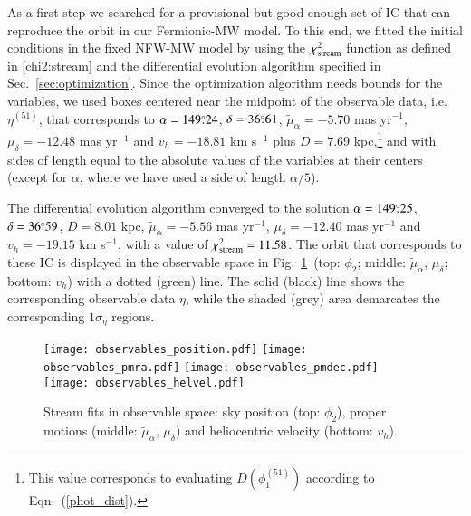 \documentclass[twocolumn]{aa}
\begin{document}
As a first step we searched for a provisional but good enough set of IC that can reproduce the orbit in our
Fermionic-MW model. To this end, we fitted the initial conditions in the fixed NFW-MW model by using the $\chi^2_{\rm{stream}}$ function as defined in \cref{chi2:stream}
and the differential evolution algorithm specified in Sec.~\ref{sec:optimization}. Since the optimization algorithm
needs bounds for the variables, we used boxes centered near the midpoint
of the observable data, i.e. $\eta^{(51)}$, that corresponds to $\alpha=149\overset{\circ}{.} 24$, $\delta=36\overset{\circ}{.} 61$, $\tilde{\mu}_\alpha=-5.70$ mas yr$^{-1}$, $\mu_\delta=-12.48$ mas yr$^{-1}$ and $v_h=-18.81$ km s$^{-1}$
plus $D=7.69$ kpc,\footnote{This value corresponds to evaluating $D(\phi_1^{(51)})$ according to Eqn.~(\ref{phot_dist}).} and with sides of length equal to the absolute values of the variables at their centers (except for $\alpha$, where we have used a side of length $\alpha/5$).

The differential evolution algorithm converged to the solution
$\alpha=149\overset{\circ}{.} 25$, $\delta=36\overset{\circ}{.} 59$, $D=8.01$ kpc, $\tilde{\mu}_\alpha=-5.56$ mas yr$^{-1}$, $\mu_\delta=-12.40$ mas yr$^{-1}$ and $v_h=-19.15$ km s$^{-1}$, with a value of $\chi^2_{\rm{stream}}= 11.58$.
The orbit that corresponds to these IC is displayed in the observable space in Fig.~\ref{fig:obs_astrometry}~(top: $\phi_2$; middle: $\tilde{\mu}_\alpha$, $\mu_\delta$; bottom: $v_h$) with a dotted (green) line. The solid (black) line shows the corresponding observable data $\eta$, while the shaded (grey) area demarcates the corresponding $1\sigma_\eta$ regions.
\begin{figure}
   \centering
   \texttt{[image: observables\_position.pdf]}
   \texttt{[image: observables\_pmra.pdf]}
   \texttt{[image: observables\_pmdec.pdf]}
   \texttt{[image: observables\_helvel.pdf]}
   \caption{Stream fits in observable space: sky position (top: $\phi_2$), proper motions (middle: $\tilde{\mu}_\alpha$, $\mu_\delta$) and heliocentric velocity (bottom: $v_h$).}
   \label{fig:obs_astrometry}
\end{figure}
\end{document}
